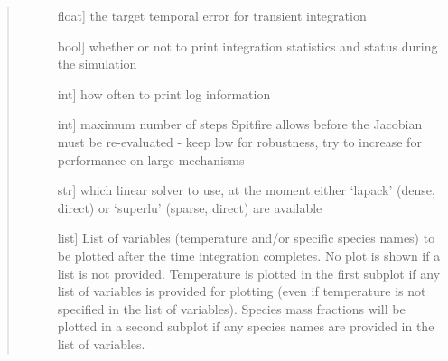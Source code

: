 \documentclass[letterpaper,10pt,english]{sphinxmanual}
\begin{document}
\begin{fulllineitems}
\begin{fulllineitems}
\begin{quote}
\begin{description}
\begin{description}
\item[{}] \leavevmode{[}float{]}
the target temporal error for transient integration

\item[{}] \leavevmode{[}bool{]}
whether or not to print integration statistics and status during the simulation

\item[{}] \leavevmode{[}int{]}
how often to print log information

\item[{}] \leavevmode{[}int{]}
maximum number of steps Spitfire allows before the Jacobian must be re-evaluated - keep low for robustness, try to increase for performance on large mechanisms

\item[{}] \leavevmode{[}str{]}
which linear solver to use, at the moment either ‘lapack’ (dense, direct) or ‘superlu’ (sparse, direct) are available

\item[{}] \leavevmode{[}list{]}
List of variables (temperature and/or specific species names) to be plotted after the time integration completes.
No plot is shown if a list is not provided.
Temperature is plotted in the first subplot if any list of variables is provided for plotting (even if temperature is not specified in the list of variables).
Species mass fractions will be plotted in a second subplot if any species names are provided in the list of variables.

\end{description}

\end{description}\end{quote}

\end{fulllineitems}



\end{fulllineitems}
\end{document}
